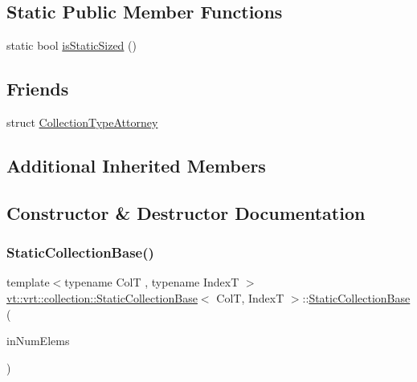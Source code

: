 \subsection*{Static Public Member Functions}
\begin{DoxyCompactItemize}
\item 
static bool \hyperlink{structvt_1_1vrt_1_1collection_1_1_static_collection_base_a2220acb376a93897e2dfde15eaaadedc}{is\+Static\+Sized} ()
\end{DoxyCompactItemize}
\subsection*{Friends}
\begin{DoxyCompactItemize}
\item 
struct \hyperlink{structvt_1_1vrt_1_1collection_1_1_static_collection_base_abb4eb03ec2c75b459ceec69021d22a2b}{Collection\+Type\+Attorney}
\end{DoxyCompactItemize}
\subsection*{Additional Inherited Members}


\subsection{Constructor \& Destructor Documentation}
\mbox{\label{structvt_1_1vrt_1_1collection_1_1_static_collection_base_a5737915628a89a38b382ccfccbe73c40}} 
\subsubsection{\texorpdfstring{Static\+Collection\+Base()}{StaticCollectionBase()}\hspace{0.1cm}{\footnotesize\ttfamily [1/2]}}
{\footnotesize\ttfamily template$<$typename ColT , typename IndexT $>$ \\
\hyperlink{structvt_1_1vrt_1_1collection_1_1_static_collection_base}{vt\+::vrt\+::collection\+::\+Static\+Collection\+Base}$<$ ColT, IndexT $>$\+::\hyperlink{structvt_1_1vrt_1_1collection_1_1_static_collection_base}{Static\+Collection\+Base} (\begin{DoxyParamCaption}\item[{\hyperlink{namespacevt_ac115668758184050beff7a9281a2c490}{Virtual\+Elm\+Count\+Type} const}]{in\+Num\+Elems }\end{DoxyParamCaption})\hspace{0.3cm}{\ttfamily [explicit]}}

